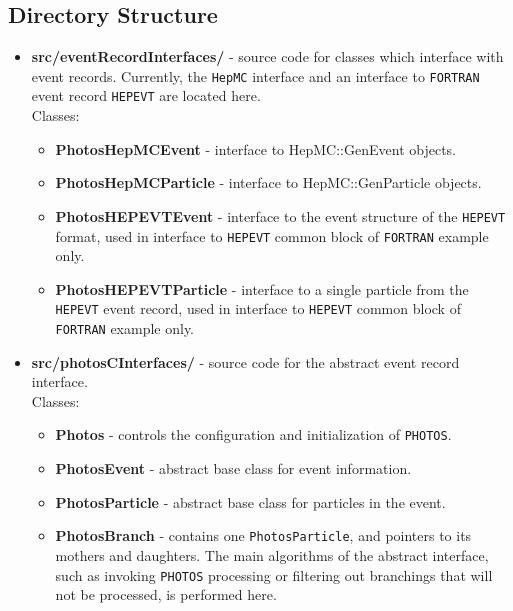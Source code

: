 \documentclass[]{Photos_interface_design}
\begin{document}
\subsection{Directory Structure}

\begin{itemize}
\item {\bf src/eventRecordInterfaces/ } - source code for classes which interface with event records.
      Currently, the {\tt HepMC} interface and an interface to {\tt FORTRAN} event record {\tt HEPEVT} are located here.\\
  Classes:
  \begin{itemize}
  \item { \bf PhotosHepMCEvent} - interface to HepMC::GenEvent objects. 
  \item { \bf PhotosHepMCParticle} - interface to HepMC::GenParticle objects. 
  \item { \bf PhotosHEPEVTEvent} - interface to the event structure of the {\tt HEPEVT} format, used in interface to {\tt HEPEVT} common block of {\tt FORTRAN} example only. 
  \item { \bf PhotosHEPEVTParticle} - interface to a single particle from the {\tt HEPEVT} event record, used in interface to {\tt HEPEVT} common block of {\tt FORTRAN} example only.
  \end{itemize}   

\item {\bf src/photosCInterfaces/ } - source code for the abstract event record interface.  \\
  Classes:
  \begin{itemize}
  \item { \bf Photos } - controls the configuration and initialization of {\tt PHOTOS}.
  \item { \bf PhotosEvent } - abstract base class for event information.
  \item { \bf PhotosParticle } - abstract base class for particles in the event.
  \item { \bf PhotosBranch } - contains one {\tt PhotosParticle}, and  pointers to its mothers and daughters.
                               The main algorithms of the abstract interface, such as invoking {\tt PHOTOS} processing
                               or filtering out branchings that will not be processed, is performed here.
  \end{itemize}


\end{itemize}
\end{document}
